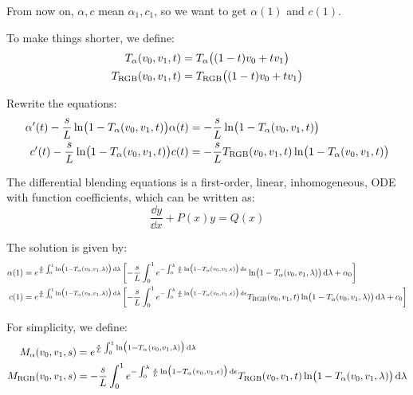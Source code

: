 \documentclass[letter, 11pt]{article}
\begin{document}
From now on, $\alpha, c$ mean $\alpha_1, c_1$, so we want to get $\alpha(1)$ and $c(1)$.

To make things shorter, we define:
\begin{align*}
T_\alpha(v_0, v_1, t) &= T_\alpha\bigl((1-t)v_0+t v_1\bigr) \\
T_{\mathrm{RGB}}(v_0, v_1, t) &= T_{\mathrm{RGB}}\bigl((1-t)v_0+t v_1\bigr)
\end{align*}

Rewrite the equations:
\begin{align*}
\alpha'(t) - \frac{s}{L} \ln\bigl(1-T_\alpha(v_0, v_1, t)\bigr) \alpha(t) &= -\frac{s}{L} \ln\bigl(1-T_\alpha(v_0, v_1, t)\bigr) \\
c'(t) - \frac{s}{L} \ln\bigl(1-T_\alpha(v_0, v_1, t)\bigr) c(t) &= -\frac{s}{L} T_{\mathrm{RGB}}(v_0, v_1, t) \ln\bigl(1-T_\alpha(v_0, v_1, t)\bigr)
\end{align*}

The differential blending equations is a first-order, linear, inhomogeneous, ODE with function coefficients, which can be written as:
\begin{equation*}
\frac{\dd y}{\dd x} + P(x)y = Q(x)
\end{equation*}

The solution is given by:
\begin{align*}
\alpha(1) &= e^{\frac{s}{L}\int_0^1  \ln\bigl(1-T_\alpha(v_0, v_1, \lambda)\bigr) \, \mathrm{d}\lambda}\left[-\frac{s}{L}\int_0^1 e^{-\int_0^\lambda \frac{s}{L} \ln\bigl(1-T_\alpha(v_0, v_1, \epsilon)\bigr) \, \mathrm{d}\epsilon} \ln\bigl(1-T_\alpha(v_0, v_1, \lambda)\bigr) \, {\mathrm{d}\lambda} +\alpha_0 \right] \\
c(1) &= e^{\frac{s}{L}\int_0^1  \ln\bigl(1-T_\alpha(v_0, v_1, \lambda)\bigr) \, \mathrm{d}\lambda}\left[-\frac{s}{L}\int_0^1 e^{-\int_0^\lambda \frac{s}{L} \ln\bigl(1-T_\alpha(v_0, v_1, \epsilon)\bigr) \, \mathrm{d}\epsilon} T_{\mathrm{RGB}}(v_0, v_1, t) \ln\bigl(1-T_\alpha(v_0, v_1, \lambda)\bigr) \, {\mathrm{d}\lambda} + c_0 \right]
\end{align*}

For simplicity, we define:
\begin{align}
M_\alpha(v_0, v_1, s) &= e^{\frac{s}{L}\int_0^1  \ln\bigl(1-T_\alpha(v_0, v_1, \lambda)\bigr) \, \mathrm{d}\lambda} \\
M_{\mathrm{RGB}}(v_0, v_1, s) &= -\frac{s}{L}\int_0^1 e^{-\int_0^\lambda \frac{s}{L} \ln\bigl(1-T_\alpha(v_0, v_1, \epsilon)\bigr) \, \mathrm{d}\epsilon} T_{\mathrm{RGB}}(v_0, v_1, t) \ln\bigl(1-T_\alpha(v_0, v_1, \lambda)\bigr) \, {\mathrm{d}\lambda}
\end{align}
\end{document}
